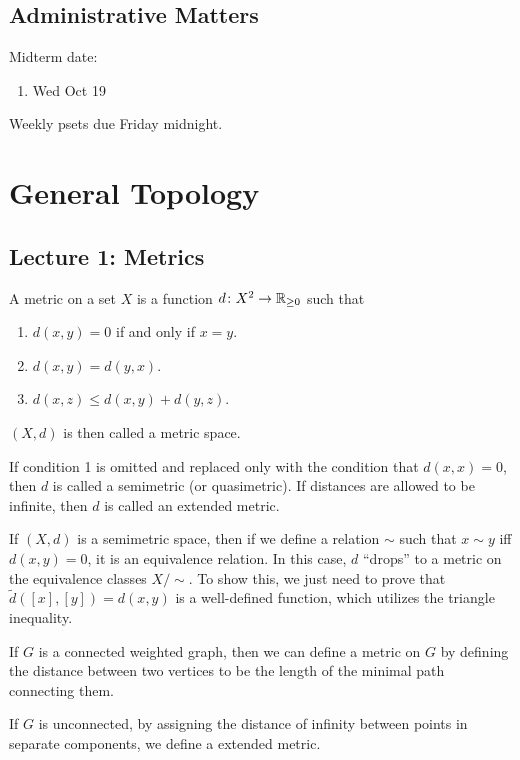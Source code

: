 \section*{Administrative Matters}
Midterm date:
\begin{enumerate}
    \item Wed Oct 19
\end{enumerate}

Weekly psets due Friday midnight.

\chapter{General Topology}

\section{Lecture 1: Metrics}

\begin{definition}
    A metric on a set $X$ is a function $d\colon X^2 \to \mathbb R_{\ge 0}$ such that
    \begin{enumerate}
        \item $d(x, y) = 0$ if and only if $x = y$.
        \item $d(x, y) = d(y, x)$.
        \item $d(x, z) \le d(x, y) + d(y, z)$.
    \end{enumerate}

    $(X, d)$ is then called a metric space.
\end{definition}

If condition 1 is omitted and replaced only with the condition that $d(x, x) = 0$, then $d$ is called a semimetric (or quasimetric). If distances are allowed to be infinite, then $d$ is called an extended metric.

If $(X, d)$ is a semimetric space, then if we define a relation $\sim$ such that $x \sim y$ iff $d(x, y) = 0$, it is an equivalence relation. In this case, $d$ ``drops'' to a metric on the equivalence classes $X/\!\sim$. To show this, we just need to prove that $\tilde d([x], [y]) = d(x, y)$ is a well-defined function, which utilizes the triangle inequality.

\begin{example}
    If $G$ is a connected weighted graph, then we can define a metric on $G$ by defining the distance between two vertices to be the length of the minimal path connecting them.

    If $G$ is unconnected, by assigning the distance of infinity between points in separate components, we define a extended metric.
\end{example}

